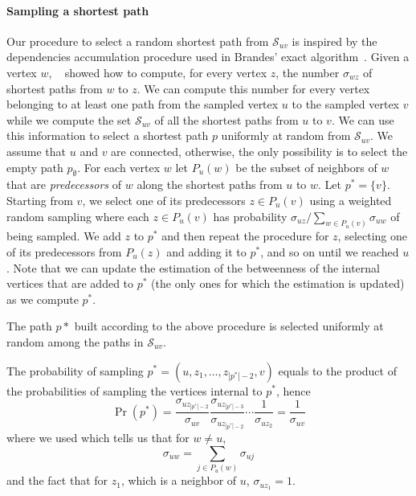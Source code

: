 \paragraph{Sampling a shortest path}
Our procedure to select a random shortest path from $\mathcal{S}_{uv}$ is
inspired by the dependencies accumulation procedure used in Brandes' exact
algorithm~\citep{Brandes01}. Given a vertex $w$, ~\citet{Brandes01} showed how
to compute, for every vertex $z$, the number $\sigma_{wz}$ of shortest paths
from $w$ to $z$. We can compute this number for every vertex belonging to at
least one path from the sampled vertex $u$ to the sampled vertex $v$ while we
compute the set $\mathcal{S}_{uv}$ of all the shortest paths from $u$ to $v$. We
can use this information to select a shortest path $p$ uniformly at random from
$\mathcal{S}_{uv}$. We assume that $u$ and $v$ are connected, otherwise, the
only possibility is to select the empty path $p_\emptyset$. For each vertex $w$
let $P_u(w)$ be the subset of neighbors of $w$ that are \emph{predecessors} of
$w$ along the shortest paths from $u$ to $w$. Let $p^*=\{v\}$. Starting from $v$,
we select one of its predecessors $z\in P_u(v)$ using a weighted random sampling
where each $z\in P_u(v)$ has probability $\sigma_{uz}/\sum_{w\in
P_u(v)}\sigma_{uw}$ of being sampled. We add $z$ to $p^*$ and  then repeat the
procedure for $z$, selecting one of its predecessors from $P_u(z)$ and adding it
to $p^*$, and so on until we reached $u$. Note that we can update the estimation
of the betweenness of the internal vertices that are added to $p^*$ (the only
ones for which the estimation is updated) as we compute $p^*$.

\begin{lemma}
  The path $p*$ built according to the above procedure is selected uniformly at
  random among the paths in $\mathcal{S}_{uv}$.
\end{lemma}

\begin{IEEEproof}
  The probability of sampling $p^*=(u,z_1,\dotsc,z_{|p^*|-2},v)$ equals to the
  product of the probabilities of sampling the vertices internal to $p^*$, hence
  \[
  \Pr(p^*)=\frac{\sigma_{uz_{|p^*|-2}}}{\sigma_{uv}}\frac{\sigma_{uz_{|p^*|-3}}}{\sigma_{uz_{|p^*|-2}}}\dotsb
  \frac{1}{\sigma_{uz_2}}=\frac{1}{\sigma_{uv}}
  \]
  where we used \citep[Lemma3]{Brandes01} which tells us that for $w\neq u$,
  \[
  \sigma_{uw}=\sum_{j\in P_u(w)}\sigma_{uj}
  \]
  and the fact that for $z_1$, which is a neighbor of $u$, $\sigma_{uz_1}=1$.
\end{IEEEproof}


